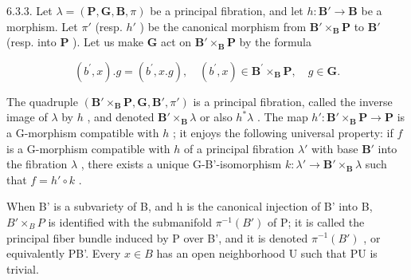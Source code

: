6.3.3. Let \(\lambda = (\mathbf{P}, \mathbf{G}, \mathbf{B}, \pi)\) be a principal fibration, and let \(h: \mathbf{B}' \to \mathbf{B}\) be a morphism. Let \(\pi'\) (resp. \(h'\) ) be the canonical morphism from \(\mathbf{B}' \times_{\mathbf{B}} \mathbf{P}\) to \(\mathbf{B}'\) (resp. into \(\mathbf{P}\) ). Let us make \(\mathbf{G}\) act on \(\mathbf{B}' \times_{\mathbf{B}} \mathbf{P}\) by the formula

\[
(b ^ {\prime}, x). g = (b ^ {\prime}, x. g), \quad (b ^ {\prime}, x) \in \mathbf {B} ^ {\prime} \times_ {\mathbf {B}} \mathbf {P}, \quad g \in \mathbf {G}.
\]

The quadruple \((\mathbf{B}' \times_{\mathbf{B}} \mathbf{P}, \mathbf{G}, \mathbf{B}', \pi')\) is a principal fibration, called the inverse image of \(\lambda\) by \(h\) , and denoted \(\mathbf{B}' \times_{\mathbf{B}} \lambda\) or also \(h^*\lambda\) . The map \(h': \mathbf{B}' \times_{\mathbf{B}} \mathbf{P} \to \mathbf{P}\) is a G-morphism compatible with \(h\) ; it enjoys the following universal property: if \(f\) is a G-morphism compatible with \(h\) of a principal fibration \(\lambda'\) with base \(\mathbf{B}'\) into the fibration \(\lambda\) , there exists a unique G-B'-isomorphism \(k: \lambda' \to \mathbf{B}' \times_{\mathbf{B}} \lambda\) such that \(f = h' \circ k\) .

When B' is a subvariety of B, and h is the canonical injection of B' into B, \(B' \times_{B} P\) is identified with the submanifold \(\pi^{-1}(B')\) of P; it is called the principal fiber bundle induced by P over B', and it is denoted \(\pi^{-1}(B')\) , or equivalently P\textbar B'. Every \(x \in B\) has an open neighborhood U such that P\textbar U is trivial.

